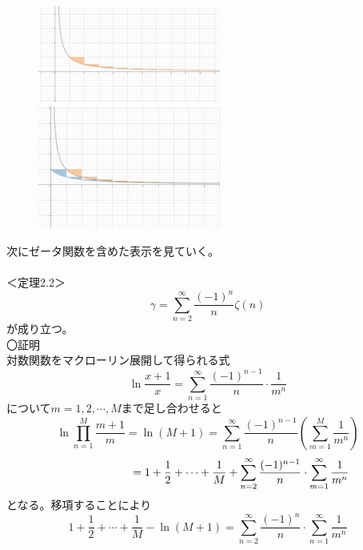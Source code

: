 \documentclass{jsarticle}
\begin{document}
\begin{figure}[h]
  \begin{minipage}{0.5\hsize}
    \begin{center}
      \includegraphics[width=60mm]{zeta-photo1.jpg}
     
    \end{center}
    \caption{}
   
  \end{minipage}
  \begin{minipage}{0.5\hsize}
    \begin{center}
      \includegraphics[width=60mm]{zeta-photo2.jpg}
    \end{center}
    \caption{}
  \end{minipage}
\end{figure}
次にゼータ関数を含めた表示を見ていく。\\
\\
＜定理2.2＞\\
\begin{equation}
\gamma=\sum_{n=2}^{\infty}\frac{(-1)^{n}}{n}\zeta(n)
\end{equation}
が成り立つ。\\
〇証明\\
対数関数をマクローリン展開して得られる式
\[\ln\frac{x+1}{x}=\sum_{n=1}^{\infty}\frac{(-1)^{n-1}}{n}\cdot\frac{1}{m^{n}}\]
について\(m=1,2,\cdots,M\)まで足し合わせると
\[\ln\prod_{n=1}^{M}\frac{m+1}{m}=\ln(M+1)=\sum_{n=1}^{\infty}\frac{(-1)^{n-1}}{n}\left(\sum_{m=1}^{M}\frac{1}{m^{n}}\right)\]
\[\hspace{21mm}=1+\frac{1}{2}+\cdots+\frac{1}{M}+\sum_{n=2}^{\infty}\frac{(-1)^{n-1}}{n}\cdot\sum_{m=1}^{\infty}\frac{1}{m^{n}}\]
となる。移項することにより
\[1+\frac{1}{2}+\cdots+\frac{1}{M}-\ln(M+1)=\sum_{n=2}^{\infty}\frac{(-1)^{n}}{n}\cdot\sum_{n=1}^{\infty}\frac{1}{m^{n}}\]
\end{document}
